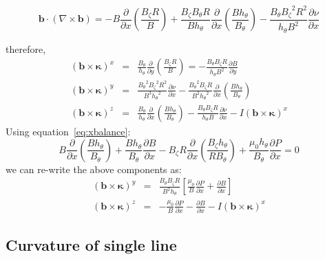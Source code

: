 \documentclass[12pt, a4paper]{article}
\newcommand{\deriv}[2]{\ensuremath{\frac{\partial #1}{\partial #2}}}
\newcommand{\hthe}{\ensuremath{h_\theta}}
\newcommand{\Bp}{\ensuremath{B_\theta}}
\newcommand{\Bt}{\ensuremath{B_\zeta}}
\begin{document}
\[
\mathbf{b}\cdot\left(\nabla\times\mathbf{b}\right) = -B\deriv{}{x}\left(\frac{\Bt R}{B}\right) + \frac{\Bt\Bp R}{B\hthe}\deriv{}{x}\left(\frac{B\hthe}{\Bp}\right) - \frac{\Bp\Bt^2R^2}{\hthe B^2}\deriv{\nu}{x}
\]

therefore,
\begin{eqnarray*}
\left(\mathbf{b}\times\mathbf{\kappa}\right)^x &=& \frac{\Bp}{\hthe}\deriv{}{y}\left(\frac{\Bt R}{B}\right) = -\frac{\Bp\Bt R}{\hthe B^2}\deriv{B}{y} \\
\left(\mathbf{b}\times\mathbf{\kappa}\right)^y &=& \frac{\Bp^2\Bt^2 R^2}{B^3\hthe^2}\deriv{\nu}{x} - \frac{\Bp^2\Bt R}{B^2\hthe^2}\deriv{}{x}\left(\frac{B\hthe}{\Bp}\right) \\
\left(\mathbf{b}\times\mathbf{\kappa}\right)^z &=& \frac{\Bp}{\hthe}\deriv{}{x}\left(\frac{B\hthe}{\Bp}\right) - \frac{\Bp\Bt R}{\hthe B}\deriv{\nu}{x} - I\left(\mathbf{b}\times\mathbf{\kappa}\right)^x
\end{eqnarray*}
Using equation~\ref{eq:xbalance}:
\[
B\deriv{}{x}\left(\frac{B\hthe}{\Bp}\right) + \frac{B\hthe}{\Bp}\deriv{B}{x} - \Bt R\deriv{}{x}\left(\frac{\Bt\hthe}{R\Bp}\right) + \frac{\mu_0\hthe}{\Bp}\deriv{P}{x} = 0
\]
we can re-write the above components as:
\begin{eqnarray*}
\left(\mathbf{b}\times\mathbf{\kappa}\right)^y &=& \frac{\Bp\Bt R}{B^2\hthe}\left[\frac{\mu_0}{B}\deriv{P}{x} + \deriv{B}{x}\right] \\
\left(\mathbf{b}\times\mathbf{\kappa}\right)^z &=& -\frac{\mu_0}{B}\deriv{P}{x} - \deriv{B}{x} - I\left(\mathbf{b}\times\mathbf{\kappa}\right)^x
\end{eqnarray*}

\subsection{Curvature of single line}
\end{document}
